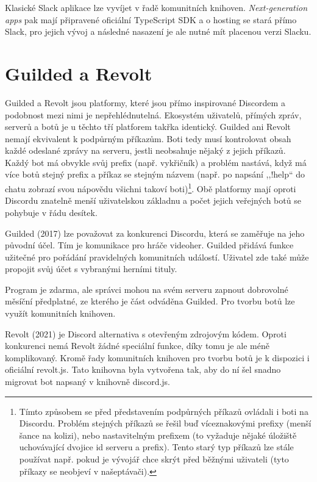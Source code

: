 \documentclass[FM]{tulthesis}
\begin{document}
	Klasické Slack aplikace lze vyvíjet v řadě komunitních knihoven. \textit{Next-generation apps} pak mají připravené oficiální \mbox{TypeScript} SDK a o hosting se stará přímo Slack, pro jejich vývoj a následné nasazení je ale nutné mít placenou verzi Slacku.
	
	\section{Guilded a Revolt}
	
	Guilded a Revolt jsou platformy, které jsou přímo inspirované Discordem a podobnost mezi nimi je nepřehlédnutelná. Ekosystém uživatelů, přímých zpráv, serverů a botů je u těchto tří platforem takřka identický. Guilded ani Revolt nemají ekvivalent k podpůrným příkazům. Boti tedy musí kontrolovat obsah každé odeslané zprávy na serveru, jestli neobsahuje nějaký z jejich příkazů. Každý bot má obvykle svůj prefix (např. vykřičník) a problém nastává, když má více botů stejný prefix a příkaz se stejným názvem (např. po napsání ,,!help`` do chatu zobrazí svou nápovědu všichni takoví boti)\footnote{Tímto způsobem se před představením podpůrných příkazů ovládali i boti na Discordu. Problém stejných příkazů se řešil buď víceznakovými prefixy (menší šance na kolizi), nebo nastavitelným prefixem (to vyžaduje nějaké úložiště uchovávající dvojice id serveru a prefix). Tento starý typ příkazů lze stále používat např. pokud je vývojář chce skrýt před běžnými uživateli (tyto příkazy se neobjeví v našeptávači).}. Obě platformy mají oproti Discordu znatelně menší uživatelskou základnu a počet jejich veřejných botů se pohybuje v řádu desítek.
	
	Guilded (2017) lze považovat za konkurenci Discordu, která se zaměřuje na jeho původní účel. Tím je komunikace pro hráče videoher. Guilded přidává funkce užitečné pro pořádání pravidelných komunitních událostí. Uživatel zde také může propojit svůj účet s vybranými herními tituly. \cite{web_guilded} 
	
	Program je zdarma, ale správci mohou na svém serveru zapnout dobrovolné měsíční předplatné, ze kterého je část odváděna Guilded. Pro tvorbu botů lze využít komunitních knihoven.
	
	Revolt (2021) je Discord alternativa s otevřeným zdrojovým kódem. Oproti konkurenci nemá Revolt žádné speciální funkce, díky tomu je ale méně komplikovaný. Kromě řady komunitních knihoven pro tvorbu botů je k dispozici i oficiální revolt.js. Tato knihovna byla vytvořena tak, aby do ní šel snadno migrovat bot napsaný v knihovně discord.js.
	
\end{document}
